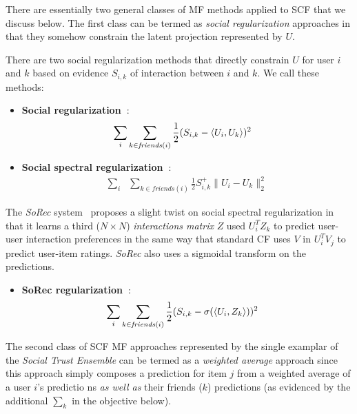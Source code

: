 There are essentially two general classes of MF methods applied to SCF that we discuss
below.  The first class can be termed as \emph{social regularization}
approaches in that they somehow constrain the latent projection
represented by $U$.  

There are two social regularization methods that directly constrain $U$ for user $i$
and $k$ based on evidence $S_{i,k}$ of interaction between $i$ and $k$.  We call
these methods:

\begin{itemize}
\item {\bf Social regularization~\cite{lla,socinf}}:
\begin{align}
\sum_{i} & \sum_{k \in \mathit{friends}(i)} \frac{1}{2} (S_{i,k} - \langle U_i, U_k \rangle)^2 \nonumber 
\end{align}

\item {\bf Social spectral regularization~\cite{sr,rrmf}}:
\begin{align}
\sum_{i} & \sum_{k \in \mathit{friends}(i)} \frac{1}{2} S^+_{i,k} \| U_i - U_k \|_2^2 \nonumber
\end{align}
\end{itemize}

The {\it SoRec} system~\cite{sorec} proposes a slight twist on social
spectral regularization in that it learns a third ($N \times N$)
\emph{interactions matrix} $Z$ used $U_i^T Z_k$ to predict user-user
interaction preferences in the same way that standard CF uses $V$ in
$U_i^T V_j$ to predict user-item ratings.  {\it SoRec} also uses a
sigmoidal transform on the predictions.

\begin{itemize}
\item {\bf SoRec regularization~\cite{sorec}}:
\begin{align}
\sum_{i} & \sum_{k \in \mathit{friends}(i)} \frac{1}{2} (S_{i,k} - \sigma(\langle U_i, Z_k \rangle))^2 \nonumber
\end{align}
\end{itemize}

The second class of SCF MF approaches represented by the single
examplar of the {\it Social Trust Ensemble} can be termed as a
\emph{weighted average} approach since this approach simply composes a
prediction for item $j$ from a weighted average of a user $i$'s
predictio
ns \emph{as well as} their friends ($k$) predictions (as
evidenced by the additional $\sum_k$ in the objective below).

